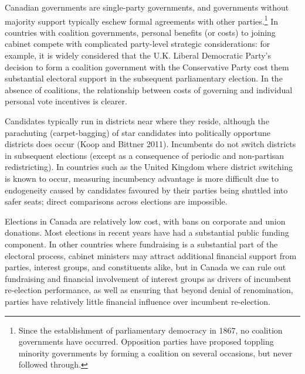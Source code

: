 \documentclass[letter,12pt]{article}
\begin{document}
Canadian governments are single-party governments, and governments without majority support typically eschew formal agreements with other parties.\footnote{Since the establishment of parliamentary democracy in 1867, no coalition governments have occurred. Opposition parties have proposed toppling minority governments by forming a coalition on several occasions, but never followed through.} In countries with coalition governments, personal benefits (or costs) to joining cabinet compete with complicated party-level strategic considerations: for example, it is widely considered that the U.K. Liberal Democratic Party's decision to form a coalition government with the Conservative Party cost them substantial electoral support in the subsequent parliamentary election. In the absence of coalitions, the relationship between costs of governing and individual personal vote incentives is clearer.

Candidates typically run in districts near where they reside, although the parachuting (carpet-bagging) of star candidates into politically opportune districts does occur (Koop and Bittner 2011). Incumbents do not switch districts in subsequent elections (except as a consequence of periodic and non-partisan redistricting). In countries such as the United Kingdom where district switching is known to occur, measuring incumbency advantage is more difficult due to endogeneity caused by candidates favoured by their parties being shuttled into safer seats; direct comparisons across elections are impossible.

Elections in Canada are relatively low cost, with bans on corporate and union donations. Most elections in recent years have had a substantial public funding component. In other countries where fundraising is a substantial part of the electoral process, cabinet ministers may attract additional financial support from parties, interest groups, and constituents alike, but in Canada we can rule out fundraising and financial involvement of interest groups as drivers of incumbent re-election performance, as well as ensuring that beyond denial of renomination, parties have relatively little financial influence over incumbent re-election.
\end{document}
